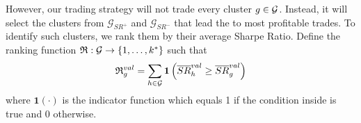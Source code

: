 \mx 
However, our trading strategy will not trade every cluster $g\in\mathcal{G}$. Instead, it will select the clusters from $\mathcal G_{SR^+}$ and $\mathcal G_{SR^-}$ that lead the to most profitable trades. 
To identify such clusters, we rank them by their average Sharpe Ratio. Define the ranking function $\mathfrak{R}: \mathcal{G} \to \left\{1, \ldots, k^*\right\}$ such that
$$
\mathfrak{R}_g^{val}
=
\sum_{h \in \mathcal{G}} 
\mathbf{1}\left(
\overline{S R}_h^{val} \geq \overline{S R}_g^{val} 
\right)
$$
where $\mathbf{1}(\cdot)$ is the indicator function which equals 1 if the condition inside is true and 0 otherwise.

